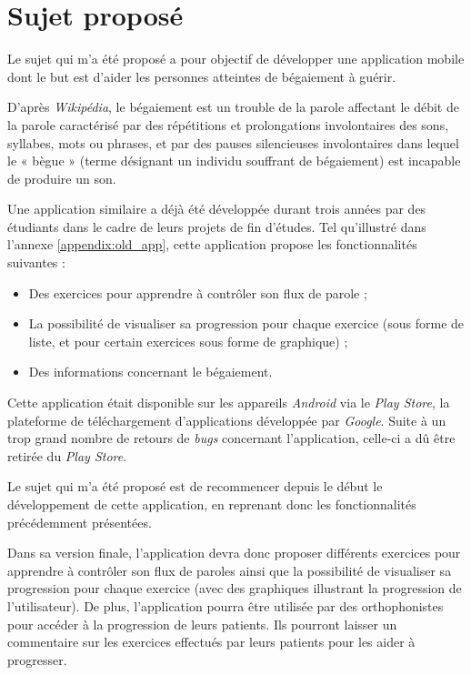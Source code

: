 \section{Sujet proposé}

Le sujet qui m'a été proposé a pour objectif de développer une application mobile dont le but est d'aider les personnes atteintes de bégaiement à guérir.

D'après \textit{Wikipédia}\cite{def_wiki}, le bégaiement est un trouble de la parole affectant le débit de la parole caractérisé par des répétitions et prolongations involontaires des sons, syllabes, mots ou phrases, et par des pauses silencieuses involontaires dans lequel le « bègue » (terme désignant un individu souffrant de bégaiement) est incapable de produire un son.

Une application similaire a déjà été développée durant trois années par des étudiants dans le cadre de leurs projets de fin d'études. Tel qu'illustré dans l'annexe \ref{appendix:old_app}, cette application propose les fonctionnalités suivantes :

\begin{itemize}
  \item Des exercices pour apprendre à contrôler son flux de parole ;
  \item La possibilité de visualiser sa progression pour chaque exercice (sous forme de liste, et pour certain exercices sous forme de graphique) ;
  \item Des informations concernant le bégaiement.
\end{itemize}

Cette application était disponible sur les appareils \textit{Android} via le \textit{Play Store}, la plateforme de téléchargement d'applications développée par \textit{Google}. Suite à un trop grand nombre de retours de \textit{bugs} concernant l'application, celle-ci a dû être retirée du \textit{Play Store}.

Le sujet qui m'a été proposé est de recommencer depuis le début le développement de cette application, en reprenant donc les fonctionnalités précédemment présentées.

Dans sa version finale, l'application devra donc proposer différents exercices pour apprendre à contrôler son flux de paroles ainsi que la possibilité de visualiser sa progression pour chaque exercice (avec des graphiques illustrant la progression de l'utilisateur). De plus, l'application pourra être utilisée par des orthophonistes pour accéder à la progression de leurs patients. Ils pourront laisser un commentaire sur les exercices effectués par leurs patients pour les aider à progresser.

